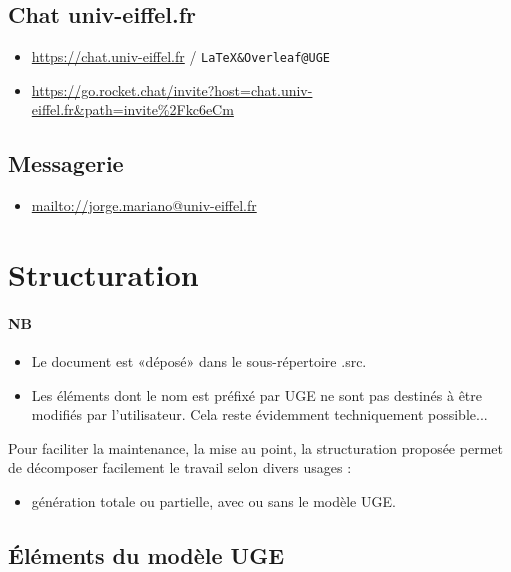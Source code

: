 \subsection{Chat univ-eiffel.fr}

\begin{itemize}
\item \url{https://chat.univ-eiffel.fr} / \verb|LaTeX&Overleaf@UGE|

\item \url{https://go.rocket.chat/invite?host=chat.univ-eiffel.fr\&path=invite\%2Fkc6eCm}
\end{itemize}
\subsection{Messagerie}

\begin{itemize}
\item \url{mailto://jorge.mariano@univ-eiffel.fr}
\end{itemize}

\section{Structuration}
\label{sec:structuration}


\paragraph{NB}

\begin{itemize}
\item Le document est «déposé» dans le sous-répertoire .src.

\item Les éléments dont le nom est préfixé par UGE ne sont pas destinés à être modifiés par l'utilisateur. Cela reste évidemment techniquement possible...
\end{itemize}

Pour faciliter la maintenance, la mise au point, la structuration proposée permet de décomposer facilement le travail selon divers usages :
\begin{itemize}
\item génération totale ou partielle, avec ou sans le modèle UGE.
\end{itemize}



\subsection{Éléments du modèle UGE}

